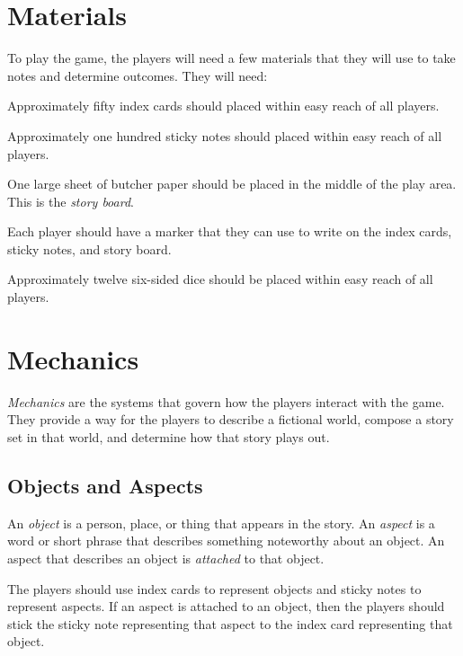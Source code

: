 \documentclass[12pt, a5paper, parskip=half-]{scrartcl}
\begin{document}
\section*{Materials}
To play the game, the players will need a few materials that they will use to take notes and determine outcomes. 
They will need:
\begin{description}[labelindent=0.25cm, leftmargin=\widthof{\hspace{0.25cm}\textbullet\space}, font=\normalfont\textbullet\bfseries\space]
	\item[Index Cards] Approximately fifty index cards should placed within easy reach of all players. 
	\item[Sticky Notes] Approximately one hundred sticky notes should placed within easy reach of all players.
	\item[Butcher Paper]	 One large sheet of butcher paper should be placed in the middle of the play area.  This is the \emph{story board}. %
	\item[Markers] Each player should have a marker that they can use to write on the index cards, sticky notes, and story board.
	\item[Dice] Approximately twelve six-sided dice should be placed within easy reach of all players. 
\end{description}

\newpage

\section*{Mechanics}    
\emph{Mechanics} are the systems that govern how the players interact with the game.
They provide a way for the players to describe a fictional world, compose a story set in that world, and determine how that story plays out.

\subsection*{Objects and Aspects}
An \emph{object} is a person, place, or thing that appears in the story.
An \emph{aspect} is a word or short phrase that describes something noteworthy about an object.
An aspect that describes an object is \emph{attached} to that object.

The players should use index cards to represent objects and sticky notes to represent aspects. 
If an aspect is attached to an object, then the players should stick the sticky note representing that aspect to the index card representing that object.
\end{document}
